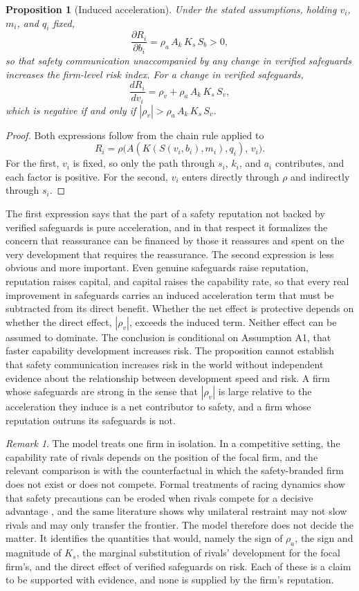 \documentclass[12pt]{article}
\newtheorem{proposition}{Proposition}
\theoremstyle{definition}
\theoremstyle{remark}
\newtheorem{remark}{Remark}
\begin{document}
\begin{proposition}[Induced acceleration]
\label{prop:accel}
Under the stated assumptions, holding $v_i$, $m_i$, and $q_i$ fixed,
\[
\frac{\partial R_i}{\partial b_i}=\rho_a\,A_k\,K_s\,S_b>0,
\]
so that safety communication unaccompanied by any change in verified safeguards increases the firm-level risk index. For a change in verified safeguards,
\[
\frac{dR_i}{dv_i}=\rho_v+\rho_a\,A_k\,K_s\,S_v,
\]
which is negative if and only if $|\rho_v|>\rho_a\,A_k\,K_s\,S_v$.
\end{proposition}

\begin{proof}
Both expressions follow from the chain rule applied to
\[
R_i=\rho\bigl(A(K(S(v_i,b_i),m_i),q_i),\,v_i\bigr).
\]
For the first, $v_i$ is fixed, so only the path through $s_i$, $k_i$, and $a_i$ contributes, and each factor is positive. For the second, $v_i$ enters directly through $\rho$ and indirectly through $s_i$. \qedhere
\end{proof}

The first expression says that the part of a safety reputation not backed by verified safeguards is pure acceleration, and in that respect it formalizes the concern that reassurance can be financed by those it reassures and spent on the very development that requires the reassurance. The second expression is less obvious and more important. Even genuine safeguards raise reputation, reputation raises capital, and capital raises the capability rate, so that every real improvement in safeguards carries an induced acceleration term that must be subtracted from its direct benefit. Whether the net effect is protective depends on whether the direct effect, $|\rho_v|$, exceeds the induced term. Neither effect can be assumed to dominate. The conclusion is conditional on Assumption A1, that faster capability development increases risk. The proposition cannot establish that safety communication increases risk in the world without independent evidence about the relationship between development speed and risk. A firm whose safeguards are strong in the sense that $|\rho_v|$ is large relative to the acceleration they induce is a net contributor to safety, and a firm whose reputation outruns its safeguards is not.

\begin{remark}
The model treats one firm in isolation. In a competitive setting, the capability rate of rivals depends on the position of the focal firm, and the relevant comparison is with the counterfactual in which the safety-branded firm does not exist or does not compete. Formal treatments of racing dynamics show that safety precautions can be eroded when rivals compete for a decisive advantage \cite{armstrong2016}, and the same literature shows why unilateral restraint may not slow rivals and may only transfer the frontier. The model therefore does not decide the matter. It identifies the quantities that would, namely the sign of $\rho_a$, the sign and magnitude of $K_s$, the marginal substitution of rivals' development for the focal firm's, and the direct effect of verified safeguards on risk. Each of these is a claim to be supported with evidence, and none is supplied by the firm's reputation.
\end{remark}
\end{document}
